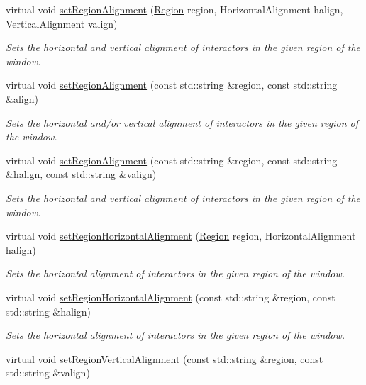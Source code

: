 \begin{DoxyCompactItemize}
virtual void \mbox{\hyperlink{classGWindow_ab4d2bfcca7a18da2847e7b4494da4a16}{set\+Region\+Alignment}} (\mbox{\hyperlink{classGWindow_a81a01a86de31071a92e6cce0bab9bc4b}{Region}} region, Horizontal\+Alignment halign, Vertical\+Alignment valign)
\begin{DoxyCompactList}\small\item\em Sets the horizontal and vertical alignment of interactors in the given region of the window. \end{DoxyCompactList}\item 
virtual void \mbox{\hyperlink{classGWindow_ae4ff46516be9472498c0bf058b496e8b}{set\+Region\+Alignment}} (const std\+::string \&region, const std\+::string \&align)
\begin{DoxyCompactList}\small\item\em Sets the horizontal and/or vertical alignment of interactors in the given region of the window. \end{DoxyCompactList}\item 
virtual void \mbox{\hyperlink{classGWindow_ad1c76be81b3b865f78b0e91f0e1f07d4}{set\+Region\+Alignment}} (const std\+::string \&region, const std\+::string \&halign, const std\+::string \&valign)
\begin{DoxyCompactList}\small\item\em Sets the horizontal and vertical alignment of interactors in the given region of the window. \end{DoxyCompactList}\item 
virtual void \mbox{\hyperlink{classGWindow_aca8f01ef261afca9c843589e8be54134}{set\+Region\+Horizontal\+Alignment}} (\mbox{\hyperlink{classGWindow_a81a01a86de31071a92e6cce0bab9bc4b}{Region}} region, Horizontal\+Alignment halign)
\begin{DoxyCompactList}\small\item\em Sets the horizontal alignment of interactors in the given region of the window. \end{DoxyCompactList}\item 
virtual void \mbox{\hyperlink{classGWindow_aefb97090ff4e149f8a0cce9efee3c451}{set\+Region\+Horizontal\+Alignment}} (const std\+::string \&region, const std\+::string \&halign)
\begin{DoxyCompactList}\small\item\em Sets the horizontal alignment of interactors in the given region of the window. \end{DoxyCompactList}\item 
virtual void \mbox{\hyperlink{classGWindow_afbe22d897ce8ef25db52cbc3d456aa0a}{set\+Region\+Vertical\+Alignment}} (const std\+::string \&region, const std\+::string \&valign)

\end{DoxyCompactItemize}
